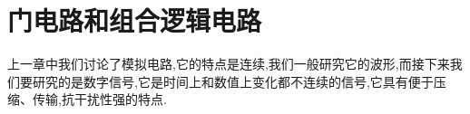 \chapter{门电路和组合逻辑电路}

\Par 上一章中我们讨论了模拟电路,它的特点是连续,我们一般研究它的波形,而接下来我们要研究的是数字信号,它是时间上和数值上变化都不连续的信号,它具有便于压缩、传输,抗干扰性强的特点.



